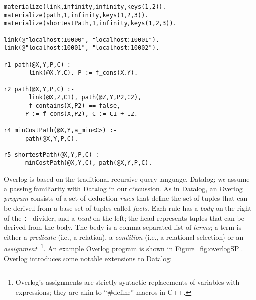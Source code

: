 \begin{figure*}
\begin{boxedminipage}{\linewidth}
\begin{verbatim}
materialize(link,infinity,infinity,keys(1,2)). 
materialize(path,1,infinity,keys(1,2,3)). 
materialize(shortestPath,1,infinity,keys(1,2,3)).

link(@"localhost:10000", "localhost:10001").
link(@"localhost:10001", "localhost:10002").

r1 path(@X,Y,P,C) :- 
       link(@X,Y,C), P := f_cons(X,Y). 
       
r2 path(@X,Y,P,C) :- 
       link(@X,Z,C1), path(@Z,Y,P2,C2),
       f_contains(X,P2) == false,
      P := f_cons(X,P2), C := C1 + C2. 
      
r4 minCostPath(@X,Y,a_min<C>) :- 
      path(@X,Y,P,C). 
      
r5 shortestPath(@X,Y,P,C) :-
      minCostPath(@X,Y,C), path(@X,Y,P,C).
\end{verbatim}
\end{boxedminipage}
\ssp
\caption{\label{fig:overlogSP}Shortest path program in Overlog. 
prefixes introduce aggregate functions and  prefixes introduce
built-in functions.}
\end{figure*}

Overlog is based on the traditional recursive query language, Datalog; we assume a passing familiarity with Datalog in our discussion.  As in Datalog, an Overlog {\em program} consists of a set of deduction {\em rules} that define the set of tuples that can be derived from a base set of tuples called {\em facts}. Each rule has a {\em body} on the right of the \texttt{:-} divider, and a {\em head} on the left; the head represents tuples that can be derived from the body.  The body is a comma-separated list of {\em terms}; a term is either a {\em predicate} (i.e., a relation), a {\em condition} (i.e., a relational selection) or an {\em assignment}~\footnote{Overlog's assignments 
are strictly syntactic replacements of variables with expressions; they
are akin to ``\#define'' macros in C++.}.  An example Overlog program is shown in Figure~\ref{fig:overlogSP}.  
Overlog introduces some notable extensions to Datalog:

